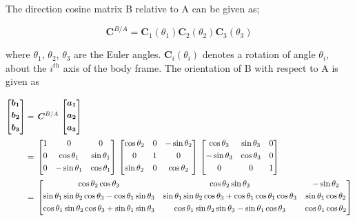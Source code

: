 The direction cosine matrix B relative to A can be given as;

\begin{equation}
\label{eqn:sequentialOrientation}
\bm{C}^{B/A}= \bm{C}_{1}(\theta_{1}) \bm{C}_{2}(\theta_{2}) \bm{C}_{3}(\theta_{3})
\end{equation}

where $\theta_{1}$, $\theta_{2}$, $\theta_{3}$ are the Euler angles. $\bm{C}_{i}(\theta_{i})$  
denotes a rotation of angle $\theta_{i}$, about the $i^{th}$ axis of the body frame. The orientation of B with respect to A is given as

\begin{align}{\label{eqn:C_B_AmatrixEuler}}
\begin{split}
\begin{bmatrix}
\bm{b_1}\\[0.3em]
\bm{b_2}\\[0.3em]
\bm{b_3}\\[0.3em]
\end{bmatrix}
& =\,
\bm{C}^{B/A}
\,
\begin{bmatrix}
\bm{a_1}\\[0.3em]
\bm{a_2}\\[0.3em]
\bm{a_3}\\[0.3em]
\end{bmatrix}
\\
& =\,
\begin{bmatrix}
1 & 0 & 0\\[0.3em]
0 & \cos\theta_1 & \sin\theta_1\\[0.3em]
0 & -\sin\theta_1 & \cos\theta_1\\[0.3em]
\end{bmatrix}
\,
\begin{bmatrix}
\cos\theta_2 & 0 & -\sin\theta_2\\[0.3em]
0 & 1 &0\\[0.3em]
\sin\theta_2 & 0 & \cos\theta_2\\[0.3em]
\end{bmatrix}
\,
\begin{bmatrix}
\cos\theta_3 & \sin\theta_3 & 0\\[0.3em]
-\sin\theta_3 & \cos\theta_3 & 0\\[0.3em]
0 & 0 & 1\\[0.3em]
\end{bmatrix}
\\
& =\,
\begin{bmatrix}
\cos\theta_2 \cos\theta_3 & \cos\theta_2 \sin\theta_3 & -\sin\theta_2\\[0.3em]
\sin\theta_1 \sin\theta_2 \cos\theta_3 - \cos\theta_1 \sin\theta_3 & \sin\theta_1 \sin\theta_2 \cos\theta_3 + \cos\theta_1 \cos\theta_1 \cos\theta_3 & \sin\theta_1 \cos\theta_2\\[0.3em]
\cos\theta_1 \sin\theta_2 \cos\theta_3 + \sin\theta_1 \sin\theta_3 & \cos\theta_1 \sin\theta_2 \sin\theta_3 - \sin\theta_1 \cos\theta_3 & \cos\theta_1 \cos\theta_2\\[0.3em]
\end{bmatrix}
\end{split}
\end{align}

